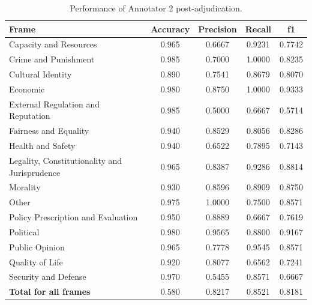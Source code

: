 \documentclass[
10pt, %
a4paper, %
oneside, %
headinclude,footinclude, %
] {book}%
\begin{document}
\begin{table}[htbp]
\small
\centering
\begin{tabular}{|l|c|c|c|c|}
\hline
\textbf{Frame} & \textbf{Accuracy} & \textbf{Precision} & \textbf{Recall} & \textbf{f1} \\
\hline
Capacity and Resources & 0.965 & 0.6667 & 0.9231 & 0.7742 \\\hline
Crime and Punishment & 0.985 & 0.7000 & 1.0000 & 0.8235 \\\hline
Cultural Identity & 0.890 & 0.7541 & 0.8679 & 0.8070 \\\hline
Economic & 0.980 & 0.8750 & 1.0000 & 0.9333 \\\hline
External Regulation and Reputation & 0.985 & 0.5000 & 0.6667 & 0.5714 \\\hline
Fairness and Equality & 0.940 & 0.8529 & 0.8056 & 0.8286 \\\hline
Health and Safety & 0.940 & 0.6522 & 0.7895 & 0.7143 \\\hline
Legality, Constitutionality and Jurisprudence & 0.965 & 0.8387 & 0.9286 & 0.8814 \\\hline
Morality & 0.930 & 0.8596 & 0.8909 & 0.8750 \\\hline
Other & 0.975 & 1.0000 & 0.7500 & 0.8571 \\\hline
Policy Prescription and Evaluation & 0.950 & 0.8889 & 0.6667 & 0.7619 \\\hline
Political & 0.980 & 0.9565 & 0.8800 & 0.9167 \\\hline
Public Opinion & 0.965 & 0.7778 & 0.9545 & 0.8571 \\\hline
Quality of Life & 0.920 & 0.8077 & 0.6562 & 0.7241 \\\hline
Security and Defense & 0.970 & 0.5455 & 0.8571 & 0.6667 \\
\hline
\textbf{Total for all frames} & 0.580 & 0.8217 & 0.8521 & 0.8181 \\
\hline
\end{tabular}
\caption{Performance of Annotator 2 post-adjudication.}
\label{tab:post_annotator2_performance}
\end{table}
\end{document}
